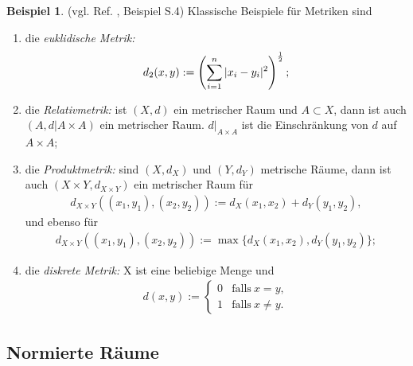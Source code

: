 \documentclass[10pt,a4paper]{article}
\theoremstyle{plain}
\theoremstyle{definition}
\theoremstyle{nonumberplain}
\newtheorem{beispiel}{Beispiel}
\newenvironment{bsp}{\begin{beispiel}}{\end{beispiel}}
\begin{document}
\begin{bsp}
(vgl. Ref. \cite{Clason}, Beispiel S.4) Klassische Beispiele für Metriken sind
\begin{enumerate}[label=(\roman*)]
\item die \textit{euklidische Metrik:} 
\begin{align*}
d_2(x,y) := \left(\sum_{i=1}^n{|x_i - y_i|^2}\right)^{1 \over 2};
\end{align*}
\item die \textit{Relativmetrik:} ist $(X, d)$ ein metrischer Raum und $A \subset X$, dann ist auch $(A, d|A \times A)$ ein metrischer Raum. $d|_{A \times A}$ ist die Einschränkung von $d$ auf $A \times A$;
\item die \textit{Produktmetrik:} sind $(X, d_X)$ und $(Y , d_Y)$ metrische Räume, dann ist auch $(X \times Y , d_{X \times Y})$ ein metrischer Raum für
\begin{align*}
d_{X \times Y}((x_1, y_1), (x_2, y_2)) := d_X (x_1, x_2) + d_Y (y_1, y_2),
\end{align*}
und ebenso für
\begin{align*}
d_{X \times Y}((x_1, y_1), (x_2, y_2)) := \max\{d_X(x_1, x_2), d_Y (y_1, y_2)\};
\end{align*}
\item die \textit{diskrete Metrik:} X ist eine beliebige Menge und
\begin{align*}
d(x, y) :=
\begin{cases}
0 & \text{falls} \: x = y,\\
1 & \text{falls} \: x \neq y.
\end{cases}
\end{align*}
\end{enumerate}
\end{bsp}\newpage

\subsection{Normierte Räume}
\end{document}
